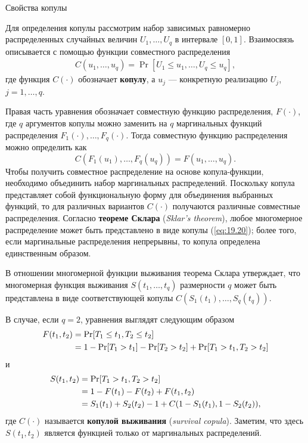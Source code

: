         \begin{center}Свойства копулы\end{center}
        \noindent
Для определения копулы рассмотрим набор зависимых равномерно распределенных случайных величин $U_1, \ldots , U_q$ в интервале $[0, 1]$. Взаимосвязь описывается с помощью функции совместного распределения
    \begin{align}\label{eq:19.20}
    C(u_1, \ldots  , u_q) = \Pr[U_1 \le u_1, \ldots  , U_q \le u_q],
    \end{align}
где функция $C(\cdot)$ обозначает \textbf{копулу}, а $u_j$ --- конкретную реализацию $U_j$, $j = 1, \ldots , q$.

Правая часть уравнения обозначает совместную функцию распределения, $F(\cdot)$, где $q$ аргументов копулы можно заменить на $q$ маргинальных функций распределения $F_1(\cdot), \ldots , F_q(\cdot)$. Тогда совместную функцию распределения можно определить как
    $$C(F_1(u_1), \ldots  , F_q(u_q)) = F(u_1, \ldots , u_q).$$
Чтобы получить совместное распределение на основе копула-функции, необходимо объединить набор маргинальных распределений. Поскольку копула представляет собой функциональную форму для объединения выбранных функций, то для различных вариантов $C(\cdot)$ получаются различные совместные распределения. Согласно \textbf{теореме Склара} (\textit{Sklar's theorem}), любое многомерное распределение может быть представлено в виде копулы (\ref{eq:19.20}); более того, если маргинальные распределения непрерывны, то копула определена единственным образом.

В отношении многомерной функции выживания теорема Склара утверждает, что многомерная функция выживания $S(t_1, \ldots , t_q)$ размерности $q$ может быть представлена в виде соответствующей копулы $C(S_1(t_1), \ldots , S_q(t_q))$.

В случае, если $q = 2$, уравнения выглядят следующим образом
    \begin{align}
    F(t_1, t_2)     &= \Pr[T_1 \le t_1, T_2 \le t_2] \notag \\
                    &= 1 - \Pr[T_1 > t_1] - \Pr[T_2 > t_2] + \Pr[T_1>t_1, T_2>t_2] \notag
    \end{align}
и
    \begin{align}
    S(t_1, t_2)     &= \Pr[T_1>t_1, T_2>t_2] \notag \\
                    &= 1-F(t_1) - F(t_2) + F(t_1,t_2) \notag \\
                    &= S_1(t_1) + S_2(t_2) - 1 + C(1-S_1(t_1), 1 - S_2(t_2)), \notag
    \end{align}
где $C(\cdot)$ называется \textbf{копулой выживания} (\textit{survival copula}). Заметим, что здесь $S(t_1, t_2)$ является функцией только от маргинальных распределений.

